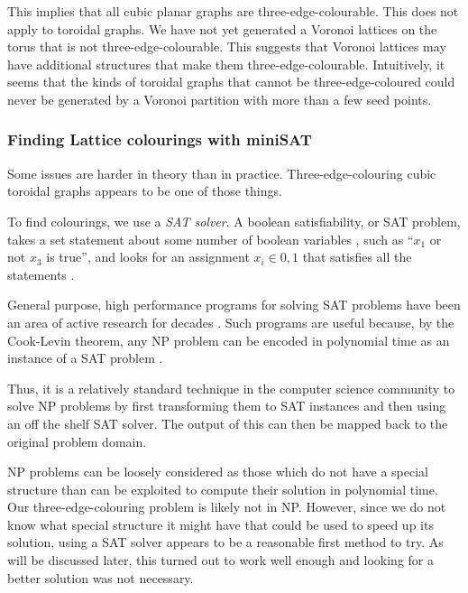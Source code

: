 This implies that all cubic planar graphs are three-edge-colourable. This does not apply to toroidal graphs. We have not yet generated a Voronoi lattices on the torus that is not three-edge-colourable. This suggests that Voronoi lattices may have additional structures that make them three-edge-colourable. Intuitively, it seems that the kinds of toroidal graphs that cannot be three-edge-coloured could never be generated by a Voronoi partition with more than a few seed points.

\hypertarget{finding-lattice-colourings-with-minisat}{%
\subsubsection{Finding Lattice colourings with miniSAT}\label{finding-lattice-colourings-with-minisat}}

Some issues are harder in theory than in practice. Three-edge-colouring cubic toroidal graphs appears to be one of those things.

To find colourings, we use a \emph{SAT solver}. A boolean satisfiability, or SAT problem, takes a set statement about some number of boolean variables , such as ``\(x_1\) or not \(x_3\) is true'', and looks for an assignment \(x_i \in {0,1}\) that satisfies all the statements \autocite{Karp1972}.

General purpose, high performance programs for solving SAT problems have been an area of active research for decades \textcite{alounehComprehensiveStudyAnalysis2019}. Such programs are useful because, by the Cook-Levin theorem, any NP problem can be encoded in polynomial time as an instance of a SAT problem \autocite{cookComplexityTheoremprovingProcedures1971,levin1973universal}.

Thus, it is a relatively standard technique in the computer science community to solve NP problems by first transforming them to SAT instances and then using an off the shelf SAT solver. The output of this can then be mapped back to the original problem domain.

NP problems can be loosely considered as those which do not have a special structure than can be exploited to compute their solution in polynomial time. Our three-edge-colouring problem is likely not in NP. However, since we do not know what special structure it might have that could be used to speed up its solution, using a SAT solver appears to be a reasonable first method to try. As will be discussed later, this turned out to work well enough and looking for a better solution was not necessary.

